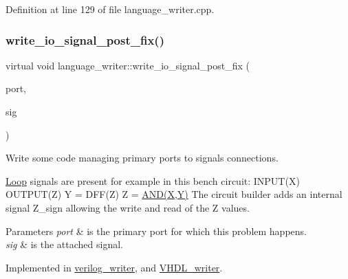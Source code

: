 Definition at line 129 of file language\+\_\+writer.\+cpp.

\mbox{\label{classlanguage__writer_a1789bbe12e4b1e4f168f4cc25bb7faff}} 
\subsubsection{\texorpdfstring{write\+\_\+io\+\_\+signal\+\_\+post\+\_\+fix()}{write\_io\_signal\_post\_fix()}}
{\footnotesize\ttfamily virtual void language\+\_\+writer\+::write\+\_\+io\+\_\+signal\+\_\+post\+\_\+fix (\begin{DoxyParamCaption}\item[{const \hyperlink{structural__objects_8hpp_a8ea5f8cc50ab8f4c31e2751074ff60b2}{structural\+\_\+object\+Ref} \&}]{port,  }\item[{const \hyperlink{structural__objects_8hpp_a8ea5f8cc50ab8f4c31e2751074ff60b2}{structural\+\_\+object\+Ref} \&}]{sig }\end{DoxyParamCaption})\hspace{0.3cm}{\ttfamily [pure virtual]}}



Write some code managing primary ports to signals connections. 

\hyperlink{classLoop}{Loop} signals are present for example in this bench circuit\+: I\+N\+P\+U\+T(\+X) O\+U\+T\+P\+U\+T(\+Z) Y = D\+F\+F(\+Z) Z = \hyperlink{tutorial__pnnl__2019_2memory_2third_2solution_2mips_8c_acd1b97556dfbbac61063a63031d2f91d}{A\+N\+D(\+X,\+Y)} The circuit builder adds an internal signal Z\+\_\+sign allowing the write and read of the Z values. 
\begin{DoxyParams}{Parameters}
{\em port} & is the primary port for which this problem happens. \\
\hline
{\em sig} & is the attached signal. \\
\hline
\end{DoxyParams}


Implemented in \hyperlink{classverilog__writer_a4f2930898accd739d654c4afb425814c}{verilog\+\_\+writer}, and \hyperlink{structVHDL__writer_ad21dd69e82fa37e50df3660cd177da3c}{V\+H\+D\+L\+\_\+writer}.

